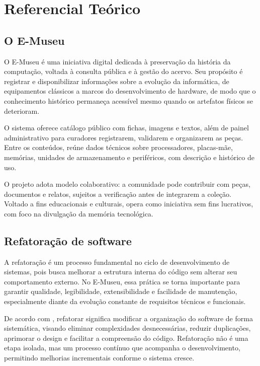 \chapter{Referencial Teórico}\label{cap-referencial-teorico}


\section{O E-Museu}

O E-Museu é uma iniciativa digital dedicada à preservação da história da computação, voltada à consulta pública e à gestão do acervo. Seu propósito é registrar e disponibilizar informações sobre a evolução da informática, de equipamentos clássicos a marcos do desenvolvimento de hardware, de modo que o conhecimento histórico permaneça acessível mesmo quando os artefatos físicos se deterioram.

O sistema oferece catálogo público com fichas, imagens e textos, além de painel administrativo para curadores registrarem, validarem e organizarem as peças. Entre os conteúdos, reúne dados técnicos sobre processadores, placas-mãe, memórias, unidades de armazenamento e periféricos, com descrição e histórico de uso.

O projeto adota modelo colaborativo: a comunidade pode contribuir com peças, documentos e relatos, sujeitos a verificação antes de integrarem a coleção. Voltado a fins educacionais e culturais, opera como iniciativa sem fins lucrativos, com foco na divulgação da memória tecnológica.


\section{Refatoração de software}

A refatoração é um processo fundamental no ciclo de desenvolvimento de sistemas, pois busca melhorar a estrutura interna do código sem alterar seu comportamento externo. No E-Museu, essa prática se torna importante para garantir qualidade, legibilidade, extensibilidade e facilidade de manutenção, especialmente diante da evolução constante de requisitos técnicos e funcionais.

De acordo com , refatorar significa modificar a organização do software de forma sistemática, visando eliminar complexidades desnecessárias, reduzir duplicações, aprimorar o design e facilitar a compreensão do código. Refatoração não é uma etapa isolada, mas um processo contínuo que acompanha o desenvolvimento, permitindo melhorias incrementais conforme o sistema cresce.

